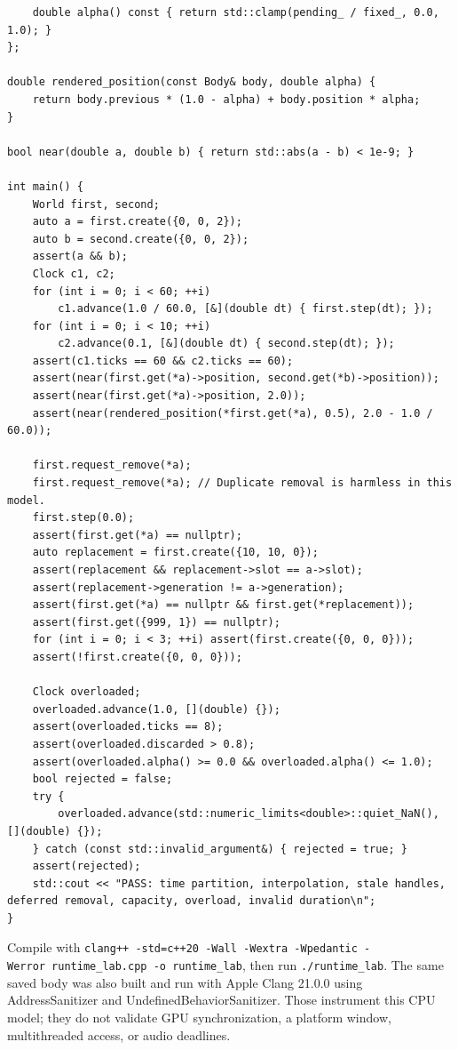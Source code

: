 \begin{verbatim}
    double alpha() const { return std::clamp(pending_ / fixed_, 0.0, 1.0); }
};

double rendered_position(const Body& body, double alpha) {
    return body.previous * (1.0 - alpha) + body.position * alpha;
}

bool near(double a, double b) { return std::abs(a - b) < 1e-9; }

int main() {
    World first, second;
    auto a = first.create({0, 0, 2});
    auto b = second.create({0, 0, 2});
    assert(a && b);
    Clock c1, c2;
    for (int i = 0; i < 60; ++i)
        c1.advance(1.0 / 60.0, [&](double dt) { first.step(dt); });
    for (int i = 0; i < 10; ++i)
        c2.advance(0.1, [&](double dt) { second.step(dt); });
    assert(c1.ticks == 60 && c2.ticks == 60);
    assert(near(first.get(*a)->position, second.get(*b)->position));
    assert(near(first.get(*a)->position, 2.0));
    assert(near(rendered_position(*first.get(*a), 0.5), 2.0 - 1.0 / 60.0));

    first.request_remove(*a);
    first.request_remove(*a); // Duplicate removal is harmless in this model.
    first.step(0.0);
    assert(first.get(*a) == nullptr);
    auto replacement = first.create({10, 10, 0});
    assert(replacement && replacement->slot == a->slot);
    assert(replacement->generation != a->generation);
    assert(first.get(*a) == nullptr && first.get(*replacement));
    assert(first.get({999, 1}) == nullptr);
    for (int i = 0; i < 3; ++i) assert(first.create({0, 0, 0}));
    assert(!first.create({0, 0, 0}));

    Clock overloaded;
    overloaded.advance(1.0, [](double) {});
    assert(overloaded.ticks == 8);
    assert(overloaded.discarded > 0.8);
    assert(overloaded.alpha() >= 0.0 && overloaded.alpha() <= 1.0);
    bool rejected = false;
    try {
        overloaded.advance(std::numeric_limits<double>::quiet_NaN(), [](double) {});
    } catch (const std::invalid_argument&) { rejected = true; }
    assert(rejected);
    std::cout << "PASS: time partition, interpolation, stale handles, deferred removal, capacity, overload, invalid duration\n";
}
\end{verbatim}

Compile with \texttt{clang++\ -std=c++20\ -Wall\ -Wextra\ -Wpedantic\ -Werror\ runtime\_lab.cpp\ -o\ runtime\_lab}, then run \texttt{./runtime\_lab}. The same saved body was also built and run with Apple Clang 21.0.0 using AddressSanitizer and UndefinedBehaviorSanitizer. Those instrument this CPU model; they do not validate GPU synchronization, a platform window, multithreaded access, or audio deadlines.

